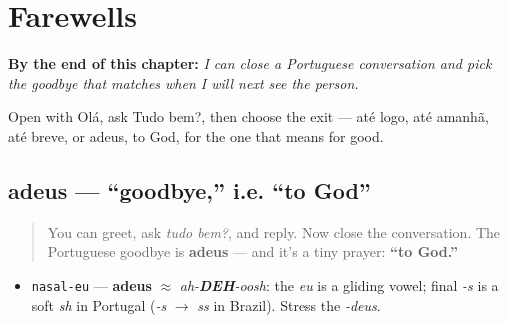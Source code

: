 
\chapter{Farewells}
\label{ch:pt-farewells}

\begin{chapteropening}
\textbf{By the end of this chapter:} \emph{I can close a Portuguese conversation and pick the goodbye that matches when I will next see the person.}

Open with Olá, ask Tudo bem?, then choose the exit — até logo, até amanhã, até breve, or adeus, to God, for the one that means for good.
\end{chapteropening}

\section[adeus]{adeus — \textquotedblleft{}goodbye,\textquotedblright{} i.e. \textquotedblleft{}to God\textquotedblright{}}

\label{lesson:PT-C04-adeus}



\begin{quote}
You can greet, ask \emph{tudo bem?}, and reply. Now close the conversation. The Portuguese goodbye is \textbf{adeus} — and it's a tiny prayer: \textbf{\textquotedblleft{}to God.\textquotedblright{}}
\end{quote}

\begin{sounds}
\begin{itemize}
\raggedright
  \item \texttt{nasal-eu} — \textbf{adeus} $\approx$ \emph{ah-\textbf{DEH}-oosh}: the \emph{eu} is a gliding vowel; final \emph{-s} is a soft \emph{sh} in Portugal (\emph{-s} $\to$ \emph{ss} in Brazil). Stress the \emph{-deus}.
\end{itemize}
\end{sounds}

